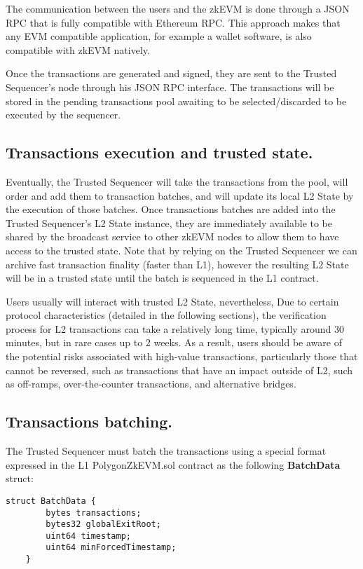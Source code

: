 The communication between the users and the zkEVM is done through a JSON RPC that is fully compatible with Ethereum RPC. This approach makes that any EVM compatible application, for example a wallet software, is also compatible with zkEVM natively.

Once the transactions are generated and signed, they are sent to the Trusted Sequencer’s node through his JSON RPC interface. The transactions will be stored in the pending transactions pool awaiting to be selected/discarded to be executed by the sequencer.

\subsection{Transactions execution and trusted state.}

Eventually, the Trusted Sequencer will take the transactions from the pool, will order and add them to transaction batches, and will update its local L2 State by the execution of those batches. Once transactions batches are added into the Trusted Sequencer's L2 State instance, they are immediately available to be shared by the broadcast service to other zkEVM nodes to allow them to have access to the trusted state. Note that by relying on the Trusted Sequencer we can archive fast transaction finality (faster than L1), however the resulting L2 State will be in a trusted state until the batch is sequenced in the L1 contract.

Users usually will interact with trusted L2 State, nevertheless, Due to certain protocol characteristics (detailed in the following sections), the verification process for L2 transactions can take a relatively long time, typically around 30 minutes, but in rare cases up to 2 weeks. As a result, users should be aware of the potential risks associated with high-value transactions, particularly those that cannot be reversed, such as transactions that have an impact outside of L2, such as off-ramps, over-the-counter transactions, and alternative bridges.



\subsection{Transactions batching.}

The Trusted Sequencer must batch the transactions using a special format expressed in the L1 PolygonZkEVM.sol contract as the following \textbf{BatchData} struct:

\begin{lstlisting}[language=Solidity]
	struct BatchData {
        bytes transactions;
        bytes32 globalExitRoot;
        uint64 timestamp;
        uint64 minForcedTimestamp;
    }
\end{lstlisting}

